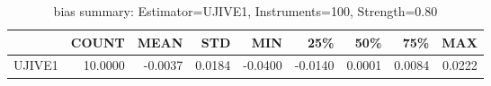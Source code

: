 \begin{table}[ht]
\centering
\caption{bias summary: Estimator=UJIVE1, Instruments=100, Strength=0.80}
\begin{tabular}{lrrrrrrrr}
\toprule
 & COUNT & MEAN & STD & MIN & 25\% & 50\% & 75\% & MAX \\
\midrule
UJIVE1 & 10.0000 & -0.0037 & 0.0184 & -0.0400 & -0.0140 & 0.0001 & 0.0084 & 0.0222 \\
\bottomrule
\end{tabular}
\end{table}
